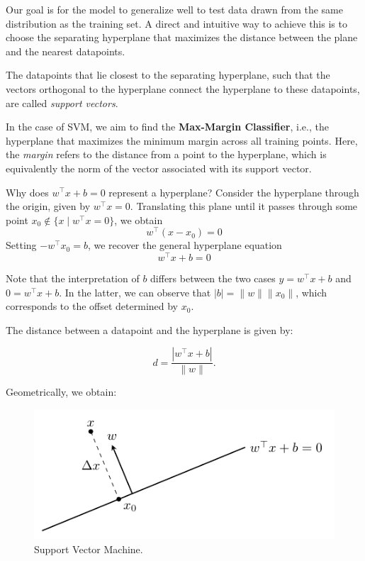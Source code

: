 \documentclass[../main]{subfiles}
\begin{document}
Our goal is for the model to generalize well to test data drawn from the same distribution as the training set.  
A direct and intuitive way to achieve this is to choose the separating hyperplane that maximizes the distance between the plane and the nearest datapoints.

\begin{definition}
    The datapoints that lie closest to the separating hyperplane, such that the vectors orthogonal to the hyperplane connect the hyperplane to these datapoints, are called \emph{support vectors}.
\end{definition}
In the case of SVM, we aim to find the \textbf{Max-Margin Classifier}, i.e., the hyperplane that maximizes the minimum margin across all training points.  
Here, the \emph{margin} refers to the distance from a point to the hyperplane, which is equivalently the norm of the vector associated with its support vector.

\begin{remark}
    Why does $w^\top x + b = 0$ represent a hyperplane?  
    Consider the hyperplane through the origin, given by $w^\top x = 0$.  
    Translating this plane until it passes through some point $x_0 \notin \{x \mid w^\top x = 0\}$, we obtain
    \[
        w^\top (x - x_0) = 0
    \]
    Setting $-w^\top x_0 = b$, we recover the general hyperplane equation
    \[
        w^\top x + b = 0
    \]
\end{remark}

\begin{remark}
    Note that the interpretation of $b$ differs between the two cases $y = w^\top x + b$ and $0 = w^\top x + b$.  
    In the latter, we can observe that $|b| = \|w\| \|x_0\|$, which corresponds to the offset determined by $x_0$.
\end{remark}
The distance between a datapoint and the hyperplane is given by:
\begin{theorem}
    \begin{equation}
        d = \frac{|w^\top x + b|}{\|w\|}. \label{3.15}
    \end{equation}
\end{theorem}

Geometrically, we obtain:

\begin{figure}[H]
    \centering
    \includegraphics{../../tikz/3/1.pdf}
    \caption{Support Vector Machine.}
    \label{2-lr}
\end{figure}
\end{document}
